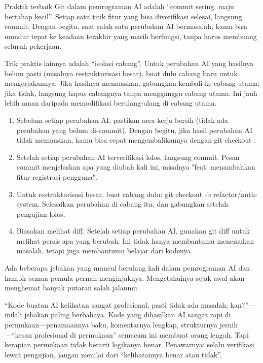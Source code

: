 Praktik terbaik Git dalam pemrograman AI adalah “commit sering, maju bertahap kecil”. Setiap satu titik fitur yang bisa diverifikasi selesai, langsung commit. Dengan begitu, saat salah satu perubahan AI bermasalah, kamu bisa mundur tepat ke keadaan terakhir yang masih berfungsi, tanpa harus membuang seluruh pekerjaan.

Trik praktis lainnya adalah “isolasi cabang”. Untuk perubahan AI yang hasilnya belum pasti (misalnya restrukturisasi besar), buat dulu cabang baru untuk mengerjakannya. Jika hasilnya memuaskan, gabungkan kembali ke cabang utama; jika tidak, langsung hapus cabangnya tanpa mengganggu cabang utama. Ini jauh lebih aman daripada memodifikasi berulang-ulang di cabang utama.

\begin{enumerate}
  \item Sebelum setiap perubahan AI, pastikan area kerja bersih (tidak ada perubahan yang belum di-commit). Dengan begitu, jika hasil perubahan AI tidak memuaskan, kamu bisa cepat mengembalikannya dengan git checkout .
  \item Setelah setiap perubahan AI terverifikasi lolos, langsung commit. Pesan commit menjelaskan apa yang diubah kali ini, misalnya "feat: menambahkan fitur registrasi pengguna".
  \item Untuk restrukturisasi besar, buat cabang dulu: git checkout -b refactor/auth-system. Selesaikan perubahan di cabang itu, dan gabungkan setelah pengujian lolos.
  \item Biasakan melihat diff. Setelah setiap perubahan AI, gunakan git diff untuk melihat persis apa yang berubah. Ini tidak hanya membantumu menemukan masalah, tetapi juga membantumu belajar dari kodenya.
\end{enumerate}


Ada beberapa jebakan yang muncul berulang kali dalam pemrograman AI dan hampir semua pemula pernah menginjaknya. Mengetahuinya sejak awal akan menghemat banyak putaran salah jalanmu.


“Kode buatan AI kelihatan sangat profesional, pasti tidak ada masalah, kan?”—inilah jebakan paling berbahaya. Kode yang dihasilkan AI sangat rapi di permukaan—penamaannya baku, komentarnya lengkap, strukturnya jernih—“kesan profesional di permukaan” semacam ini membuat orang lengah. Tapi kerapian permukaan tidak berarti logikanya benar. Penawarnya: selalu verifikasi lewat pengujian, jangan menilai dari “kelihatannya benar atau tidak”.

